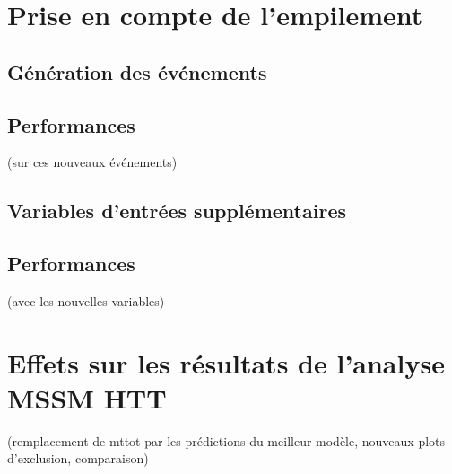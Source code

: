 \section{Prise en compte de l'empilement}
\subsection{Génération des événements}
\subsection{Performances} (sur ces nouveaux événements)
\subsection{Variables d'entrées supplémentaires}
\subsection{Performances} (avec les nouvelles variables)

\section{Effets sur les résultats de l'analyse MSSM HTT}
(remplacement de mttot par les prédictions du meilleur modèle, nouveaux plots d'exclusion, comparaison)

